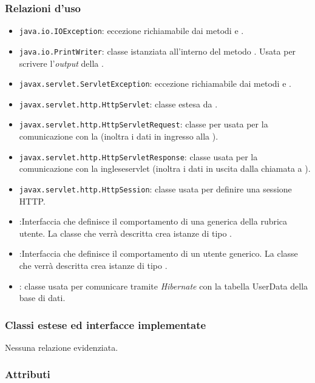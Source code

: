 \subsubsection*{Relazioni d'uso}

\begin{itemize}
	\item \texttt{java.io.IOException}: eccezione richiamabile dai metodi  e .
	\item \texttt{java.io.PrintWriter}: classe istanziata all'interno del metodo . Usata per scrivere l'\textit{output} della .
	\item \texttt{javax.servlet.ServletException}: eccezione richiamabile dai metodi  e .
	\item \texttt{javax.servlet.http.HttpServlet}: classe estesa da .
	\item \texttt{javax.servlet.http.HttpServletRequest}:  classe per usata per la comunicazione con la  (inoltra i dati in ingresso alla ).
	\item \texttt{javax.servlet.http.HttpServletResponse}: classe usata per la comunicazione con la inglese{servlet} (inoltra i dati in uscita dalla chiamata a ).
	\item \texttt{javax.servlet.http.HttpSession}: classe usata per definire una sessione HTTP.
	\item {}:Interfaccia che definisce il comportamento di una generica  della rubrica utente. La classe che verrà descritta crea istanze di tipo .
	\item {}:Interfaccia che definisce il comportamento di un utente generico. La classe che verrà descritta crea istanze di tipo .
	\item {}: classe usata per comunicare tramite \textit{Hibernate} con la tabella UserData della base di dati.
\end{itemize}

\subsubsection*{Classi estese ed interfacce implementate}

Nessuna relazione evidenziata.

\subsubsection*{Attributi}


